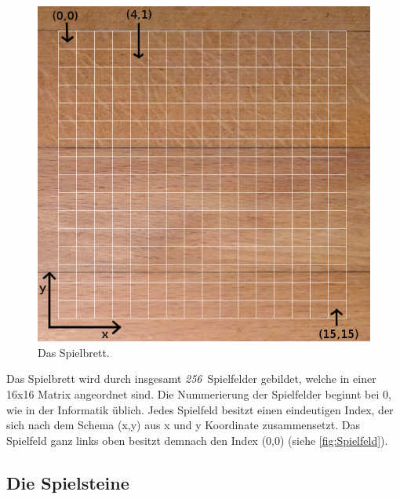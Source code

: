 \documentclass[a4paper, ngerman]{scrartcl}
\newcommand{\SpielFelderAnzahl}{\emph{256}}
\begin{document}
\begin{figure}[h] \centering 
	\includegraphics[scale = 0.25]{images/Spielbrett}
	\caption{Das Spielbrett.}
	\label{fig:Spielfeld}
\end{figure}
Das Spielbrett wird durch insgesamt \SpielFelderAnzahl\ Spielfelder gebildet, welche in einer 16x16 Matrix angeordnet sind. Die Nummerierung der Spielfelder beginnt bei 0, wie in der Informatik üblich. Jedes Spielfeld besitzt einen eindeutigen Index, der sich  nach dem Schema (x,y) aus x und y Koordinate zusammensetzt. Das Spielfeld ganz links oben besitzt demnach den Index (0,0) (siehe \autoref{fig:Spielfeld}).\\

\subsection{Die Spielsteine}
\end{document}
